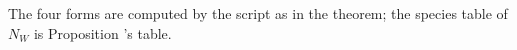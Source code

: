 The four forms are computed by the script as in the theorem; the species table of $N_{W}$ is Proposition 's table.
